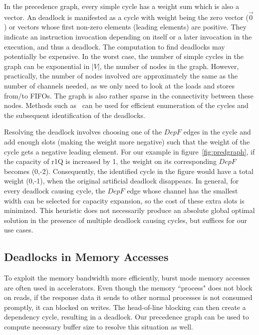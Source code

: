 \documentclass{sig-alternate}
\begin{document}
In the precedence graph, every simple cycle has a weight sum which is also a vector. An deadlock is manifested as a cycle with weight being the zero vector ($\vec{0}$) or vectors whose first non-zero elements (leading elements) are positive.
They indicate an instruction invocation depending on itself or a later invocation in the execution, and thus a deadlock. 
The computation to find deadlocks may potentially be expensive. In the worst case, the number of simple cycles in the graph can be exponential in
$|V|$, the number of nodes in the graph. However, practically, the number of
nodes involved are approximately the same as the number of channels needed, as
we only need to look at the loads and stores from/to FIFOs.
The graph is also rather sparse in the connectivity between these nodes.  
Methods such as~\cite{doi:10.1137/0204007} can be used for efficient
enumeration of the cycles and the subsequent identification of the deadlocks.

Resolving
the deadlock involves choosing one of the $DepF$ edges
in the cycle and add enough slots (making the weight more negative)
such that the weight of the cycle gets a negative leading element. For our example in figure~\ref{fig:predgraph}, if the capacity of r1Q
is increased by 1, the weight on its corresponding $DepF$ becomes (0,-2). Consequently, the identified cycle in the figure would have
a total weight (0,-1), when the original artificial deadlock disappears.
In general, for every deadlock causing cycle, the $DepF$ edge whose channel has the smallest width can be selected for capacity expansion, so the cost of these extra slots is minimized. This heuristic does not necessarily produce an absolute
global optimal solution in the presence of multiple deadlock causing cycles, but suffices for our use cases.








\subsection{Deadlocks in Memory Accesses}
To exploit the memory bandwidth more efficiently, burst mode memory accesses are often used in accelerators. Even though the memory ``process" does not block on reads, if the response data it sends to other normal processes is not consumed promptly, it can blocked on writes. 
The head-of-line blocking can then create a dependency cycle, resulting in a deadlock. Our precedence graph can be used to compute necessary buffer size to resolve this situation as well.
\end{document}
